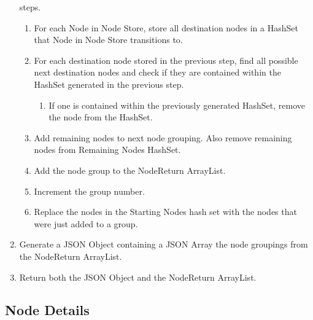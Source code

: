 \begin{enumerate}
   steps.
   \begin{enumerate}
     \item For each Node in Node Store, store all destination nodes in a HashSet
     that Node in Node Store transitions to.
     \item For each destination node stored in the previous step, find all
     possible next destination nodes and check if they are contained within the
     HashSet generated in the previous step.
     \begin{enumerate}
       \item If one is contained within the previously generated HashSet, remove
       the node from the HashSet.
     \end{enumerate}
     \item Add remaining nodes to next node grouping.  Also remove remaining
     nodes from Remaining Nodes HashSet.
     \item Add the node group to the NodeReturn ArrayList.
     \item Increment the group number.
     \item Replace the nodes in the Starting Nodes hash set with the nodes that
     were just added to a group.
   \end{enumerate} 
   \item Generate a JSON Object containing a JSON Array the node groupings from
   the NodeReturn ArrayList.
   \item Return both the JSON Object and the NodeReturn ArrayList.
 \end{enumerate}



\subsection{Node Details}

